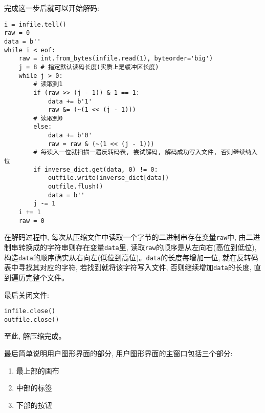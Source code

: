\documentclass[a4paper]{ctexart}
\begin{document}
完成这一步后就可以开始解码:

{\setmainfont{Courier New Bold}              
\begin{lstlisting}
i = infile.tell()
raw = 0
data = b''
while i < eof:
    raw = int.from_bytes(infile.read(1), byteorder='big')
    j = 8 # 指定默认读码长度(实质上是缓冲区长度)
    while j > 0:
        # 读取到1
        if (raw >> (j - 1)) & 1 == 1:
            data += b'1'
            raw &= (~(1 << (j - 1)))
        # 读取到0
        else:
            data += b'0'
            raw = raw & (~(1 << (j - 1)))
        # 每读入一位就扫描一遍反转码表, 尝试解码, 解码成功写入文件, 否则继续纳入位
        if inverse_dict.get(data, 0) != 0:
            outfile.write(inverse_dict[data])
            outfile.flush()
            data = b''
        j -= 1
    i += 1
    raw = 0
\end{lstlisting}}

在解码过程中, 每次从压缩文件中读取一个字节的二进制串存在变量\texttt{raw}中, 由二进制串转换成的字符串则存在变量\texttt{data}里, 读取\texttt{raw}的顺序是从左向右(高位到低位), 构造\texttt{data}的顺序确实从右向左(低位到高位)。\texttt{data}的长度每增加一位, 就在反转码表中寻找其对应的字符, 若找到就将该字符写入文件, 否则继续增加\texttt{data}的长度, 直到遍历完整个文件。

最后关闭文件:

{\setmainfont{Courier New Bold}              
\begin{lstlisting}
infile.close()
outfile.close()
\end{lstlisting}}

至此, 解压缩完成。

最后简单说明用户图形界面的部分, 用户图形界面的主窗口包括三个部分:

\begin{enumerate}
\def\labelenumi{\arabic{enumi}.}
\item
  最上部的画布
\item
  中部的标签
\item
  下部的按钮
\end{enumerate}
\end{document}
